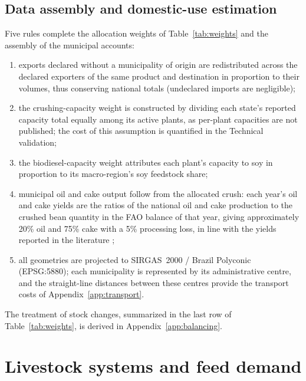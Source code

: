 \documentclass[pdflatex,sn-nature]{sn-jnl}%
\begin{document}
\subsection{Data assembly and domestic-use estimation}\label{subsubsec:domuse}
\label{subsubsec:assemble}
Five rules complete the allocation weights of Table~\ref{tab:weights}
and the assembly of the municipal accounts:
\begin{enumerate}
\item exports declared without a municipality of origin are
redistributed across the declared exporters of the same product and
destination in proportion to their volumes, thus conserving national
totals (undeclared imports are negligible);
\item the crushing-capacity weight is constructed by dividing each
state's reported capacity total equally among its active plants, as
per-plant capacities are not published; the cost of this assumption is
quantified in the Technical validation;
\item the biodiesel-capacity weight attributes each plant's capacity
to soy in proportion to its macro-region's soy feedstock share;
\item municipal oil and cake output follow from the allocated crush:
each year's oil and cake yields are the ratios of the national oil and
cake production to the crushed bean quantity in the FAO balance of
that year, giving approximately 20\% oil and 75\% cake with a 5\%
processing loss, in line with the yields reported in the literature
\cite{smaling2008soy,dei2011soybean};
\item all geometries are projected to SIRGAS~2000 / Brazil Polyconic
(EPSG:5880); each municipality is represented by its administrative
centre, and the straight-line distances between these centres provide
the transport costs of Appendix~\ref{app:transport}.
\end{enumerate}
The treatment of stock changes, summarized in the last row of
Table~\ref{tab:weights}, is derived in Appendix~\ref{app:balancing}.

\section{Livestock systems and feed demand}\label{app:livestock}
\end{document}
